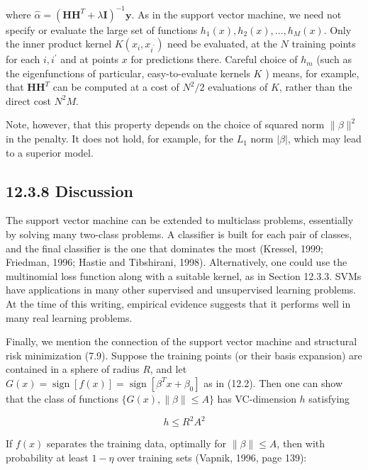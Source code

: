 \documentclass[10pt]{article}
\begin{document}
where $\hat{\alpha}=\left(\mathbf{H H}^{T}+\lambda \mathbf{I}\right)^{-1} \mathbf{y}$. As in the support vector machine, we need not specify or evaluate the large set of functions $h_{1}(x), h_{2}(x), \ldots, h_{M}(x)$. Only the inner product kernel $K\left(x_{i}, x_{i^{\prime}}\right)$ need be evaluated, at the $N$ training points for each $i, i^{\prime}$ and at points $x$ for predictions there. Careful choice of $h_{m}$ (such as the eigenfunctions of particular, easy-to-evaluate kernels $K$ ) means, for example, that $\mathbf{H} \mathbf{H}^{T}$ can be computed at a cost of $N^{2} / 2$ evaluations of $K$, rather than the direct cost $N^{2} M$.

Note, however, that this property depends on the choice of squared norm $\|\beta\|^{2}$ in the penalty. It does not hold, for example, for the $L_{1}$ norm $|\beta|$, which may lead to a superior model.

\subsection*{12.3.8 Discussion}
The support vector machine can be extended to multiclass problems, essentially by solving many two-class problems. A classifier is built for each pair of classes, and the final classifier is the one that dominates the most (Kressel, 1999; Friedman, 1996; Hastie and Tibshirani, 1998). Alternatively, one could use the multinomial loss function along with a suitable kernel, as in Section 12.3.3. SVMs have applications in many other supervised and unsupervised learning problems. At the time of this writing, empirical evidence suggests that it performs well in many real learning problems.

Finally, we mention the connection of the support vector machine and structural risk minimization (7.9). Suppose the training points (or their basis expansion) are contained in a sphere of radius $R$, and let $G(x)= \operatorname{sign}[f(x)]=\operatorname{sign}\left[\beta^{T} x+\beta_{0}\right]$ as in (12.2). Then one can show that the class of functions $\{G(x),\|\beta\| \leq A\}$ has VC-dimension $h$ satisfying


\begin{equation*}
h \leq R^{2} A^{2} \tag{12.50}
\end{equation*}


If $f(x)$ separates the training data, optimally for $\|\beta\| \leq A$, then with probability at least $1-\eta$ over training sets (Vapnik, 1996, page 139):
\end{document}
